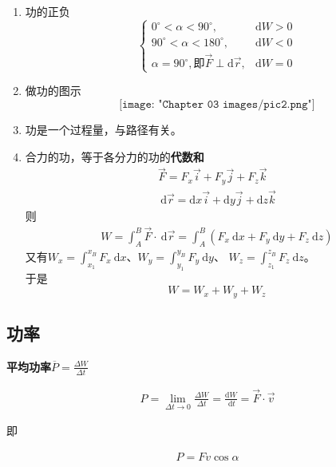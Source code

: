 \documentclass[
	12pt, %
	a4paper, %
]{myLegrandOrangeBook}
\newcommand{\rmd}{\mathrm{d}}
\begin{document}
    \begin{enumerate}
        \item 功的正负
            $$
                \begin{cases}0^{\circ}<\alpha<90^{\circ}, & \mathrm{d} W>0 \\
                90^{\circ}<\alpha<180^{\circ}, & \mathrm{d} W<0 \\
                \alpha=90^{\circ}, \text{即} \overrightarrow{F} \perp \rmd \overrightarrow{r}, & \rmd W=0\end{cases}
            $$
        \item 做功的图示
            \[
                \texttt{[image: "Chapter 03 images/pic2.png"]}
            \]
        \item 功是一个过程量，与路径有关。
        \item 合力的功，等于各分力的功的\textbf{代数和}
            \begin{align*}
                \overrightarrow{F}=F_x \overrightarrow{i}+F_y \overrightarrow{j}+F_z \overrightarrow{k} \\
                \mathrm{~d} \overrightarrow{r}=\mathrm{d} x \overrightarrow{i}+\mathrm{d} y \overrightarrow{j}+\mathrm{d} z \overrightarrow{k}
            \end{align*}
            则
            \begin{align*}
                W=\int_A^B \overrightarrow{F} \cdot \mathrm{~d} \overrightarrow{r}=
                \int_A^B\left(F_x \mathrm{~d} x+F_y \mathrm{~d} y+F_z \mathrm{~d} z\right)
            \end{align*}
            又有$W_x=\int_{x_1}^{x_B} F_x \mathrm{~d} x$、$W_y=\int_{y_1}^{y_B} F_y \mathrm{~d} y$、
            $W_z=\int_{z_1}^{z_B} F_z\mathrm{~d} z$。\\
            于是
            \[
                W = W_x + W_y + W_z
            \]

    \end{enumerate}

    \subsection{功率}

    \textbf{平均功率}$\overline{P}=\frac{\Delta W}{\Delta t}$

    \vspace{1em}
    \begin{definition}[瞬时功率]

        \begin{align}
            P=\lim _{\Delta t \rightarrow 0} \frac{\Delta W}{\Delta t}=\frac{\mathrm{d} W}{\mathrm{~d} t}=\overrightarrow{F} \cdot \overrightarrow{v}
        \end{align}

        即

        \begin{align}
            P = Fv\cos\alpha
        \end{align}

    \end{definition}
\end{document}
